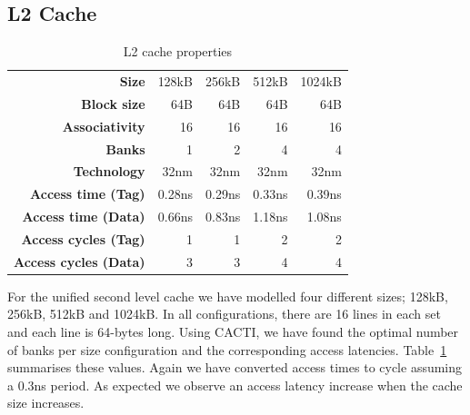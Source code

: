 \subsection{L2 Cache}
\begin{table}[ht]
\centering
\begin{tabular}{rrrrr}
\toprule
\bf{Size}                 & 128kB       & 256kB       & 512kB       & 1024kB            \\
\bf{Block size}           & 64B         & 64B         & 64B         & 64B               \\
\bf{Associativity}        & 16          & 16          & 16          & 16                \\
\bf{Banks}                & 1           & 2           & 4           & 4                 \\
\bf{Technology}           & 32nm        & 32nm        & 32nm        & 32nm              \\
\bf{Access time (Tag)}    & 0.28ns      & 0.29ns      & 0.33ns      & 0.39ns            \\
\bf{Access time (Data)}   & 0.66ns      & 0.83ns      & 1.18ns      & 1.08ns            \\
\bf{Access cycles (Tag)}  & 1           & 1           & 2           & 2                 \\
\bf{Access cycles (Data)} & 3           & 3           & 4           & 4                 \\
\bottomrule
\end{tabular}
\caption{L2 cache properties}
\label{tbl:processor_model:l2}
\end{table}

For the unified second level cache we have modelled four different sizes; 128kB, 256kB, 512kB and 1024kB. 
In all configurations, there are 16 lines in each set and each line is 64-bytes long.
Using CACTI, we have found the optimal number of banks per size configuration and the corresponding access latencies.
Table~\ref{tbl:processor_model:l2} summarises these values. 
Again we have converted access times to cycle assuming a 0.3ns period.
As expected we observe an access latency increase when the cache size increases.

